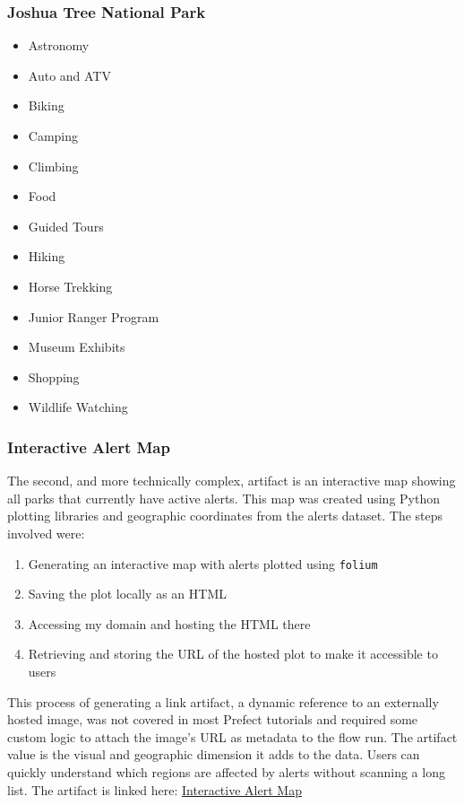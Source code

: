 \documentclass[
  letterpaper,
  DIV=11,
  numbers=noendperiod]{scrartcl}
\providecommand{\tightlist}{%
  \setlength{\itemsep}{0pt}\setlength{\parskip}{0pt}}\usepackage{longtable,booktabs,array}
\begin{document}
\subsubsection{Joshua Tree National
Park}\label{joshua-tree-national-park}

\begin{itemize}
\tightlist
\item
  Astronomy
\item
  Auto and ATV
\item
  Biking
\item
  Camping
\item
  Climbing
\item
  Food
\item
  Guided Tours
\item
  Hiking
\item
  Horse Trekking
\item
  Junior Ranger Program
\item
  Museum Exhibits
\item
  Shopping
\item
  Wildlife Watching
\end{itemize}

\subsubsection{Interactive Alert Map}\label{interactive-alert-map}

The second, and more technically complex, artifact is an interactive map
showing all parks that currently have active alerts. This map was
created using Python plotting libraries and geographic coordinates from
the alerts dataset. The steps involved were:

\begin{enumerate}
\def\labelenumi{\arabic{enumi}.}
\tightlist
\item
  Generating an interactive map with alerts plotted using
  \texttt{folium}
\item
  Saving the plot locally as an HTML
\item
  Accessing my domain and hosting the HTML there
\item
  Retrieving and storing the URL of the hosted plot to make it
  accessible to users
\end{enumerate}

This process of generating a link artifact, a dynamic reference to an
externally hosted image, was not covered in most Prefect tutorials and
required some custom logic to attach the image's URL as metadata to the
flow run. The artifact value is the visual and geographic dimension it
adds to the data. Users can quickly understand which regions are
affected by alerts without scanning a long list. The artifact is linked
here:
\href{https://gjl.georgetown.domains/5500-project/map.html}{Interactive
Alert Map}
\end{document}
